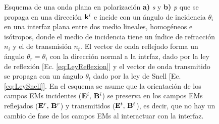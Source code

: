 \begin{figure}[h!]
\begin{subfigure}{.43\textwidth}
	\end{subfigure} 
	\caption{ Esquema de una onda plana en polarización \textbf{a)} \emph{s} y \textbf{b)} \emph{p} que se propaga en una dirección $\vb{k}^i$ e incide con un ángulo de incidencia $\theta_i$ en una interfaz plana entre dos medio lineales, homogéneos e isótropos, donde el medio de incidencia tiene un índice de refracción $n_i$ y el de transmisión $n_t$. El vector de onda reflejado forma un ángulo $\theta_r=\theta_i$ con la dirección normal a la intrfaz, dado por la ley de reflexión [Ec. \eqref{eq:LeyReflexion}] y el vector de onda transmitido se propaga con un ángulo $\theta_t$ dado por la ley de Snell [Ec. \eqref{eq:LeySnell}]. En el esquema se asume que la orientación de los campos EMs incidentes  ($\vb{E}^i,\,\vb{B}^i$) se preserva en los campos EMs reflejados ($\vb{E}^r,\,\vb{B}^r$) y transmitidos ($\vb{E}^t,\,\vb{B}^t$), es decir, que no hay un cambio de fase de los campos EMs al interactuar con la interfaz.}	\label{fig:Polarizaciones}	
	\end{figure}	
%

